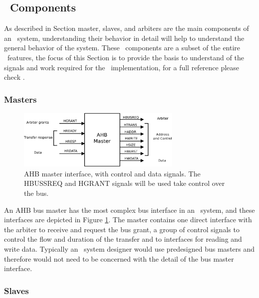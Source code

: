 \subsection{\amba~Components}
As described in Section \label{subsec:ahbops}  master, slaves, and arbiters are the main components of an \amba~system, understanding their behavior in detail will help to understand the general behavior of the system. These \amba~components are a  subset of the entire \amba~features, the focus of this Section is to provide the basis to understand of the signals and work required for the \cshia~implementation, for a full reference please check \cite{ARMAMBA2}.

\subsubsection{Masters}
\begin{figure}[!ht]
    \centering
    \includegraphics[width=0.7\textwidth]{figures/pdf/ahb_master_new.pdf}
    \caption{AHB master interface, with control and data signals. The HBUSSREQ and HGRANT signals  will be used take control over the bus.}
    \label{fig:masterint}
\end{figure}

 An AHB bus master has the most complex bus interface in an \amba~system, and these interfaces are depicted in Figure \ref{fig:masterint}. The master contains one direct interface with the arbiter to receive and request the bus grant, a group of control signals to control the flow and duration of the transfer and to interfaces for reading and write data.  Typically an \amba~system designer would use predesigned bus masters and therefore would not need to be concerned with the detail of the bus master interface.



\subsubsection{Slaves}

